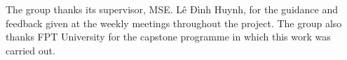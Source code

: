 The group thanks its supervisor, MSE. Lê Đình Huynh, for the guidance and feedback given at the weekly meetings throughout the project.
The group also thanks FPT University for the capstone programme in which this work was carried out.
